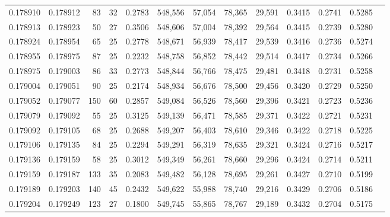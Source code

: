 \begin{tabular}{rrrrrrrrrrrrr}
0.178910 & 0.178912 &  83 &  32 &                                     0.2783 & 548,556 &  57,054 &  78,365 &  29,591 & 0.3415 & 0.2741 & 0.5285 \\
0.178913 & 0.178923 &  50 &  27 &                                     0.3506 & 548,606 &  57,004 &  78,392 &  29,564 & 0.3415 & 0.2739 & 0.5280 \\
0.178924 & 0.178954 &  65 &  25 &                                     0.2778 & 548,671 &  56,939 &  78,417 &  29,539 & 0.3416 & 0.2736 & 0.5274 \\
0.178955 & 0.178975 &  87 &  25 &                                     0.2232 & 548,758 &  56,852 &  78,442 &  29,514 & 0.3417 & 0.2734 & 0.5266 \\
0.178975 & 0.179003 &  86 &  33 &                                     0.2773 & 548,844 &  56,766 &  78,475 &  29,481 & 0.3418 & 0.2731 & 0.5258 \\
0.179004 & 0.179051 &  90 &  25 &                                     0.2174 & 548,934 &  56,676 &  78,500 &  29,456 & 0.3420 & 0.2729 & 0.5250 \\
0.179052 & 0.179077 & 150 &  60 &                                     0.2857 & 549,084 &  56,526 &  78,560 &  29,396 & 0.3421 & 0.2723 & 0.5236 \\
0.179079 & 0.179092 &  55 &  25 &                                     0.3125 & 549,139 &  56,471 &  78,585 &  29,371 & 0.3422 & 0.2721 & 0.5231 \\
0.179092 & 0.179105 &  68 &  25 &                                     0.2688 & 549,207 &  56,403 &  78,610 &  29,346 & 0.3422 & 0.2718 & 0.5225 \\
0.179106 & 0.179135 &  84 &  25 &                                     0.2294 & 549,291 &  56,319 &  78,635 &  29,321 & 0.3424 & 0.2716 & 0.5217 \\
0.179136 & 0.179159 &  58 &  25 &                                     0.3012 & 549,349 &  56,261 &  78,660 &  29,296 & 0.3424 & 0.2714 & 0.5211 \\
0.179159 & 0.179187 & 133 &  35 &                                     0.2083 & 549,482 &  56,128 &  78,695 &  29,261 & 0.3427 & 0.2710 & 0.5199 \\
0.179189 & 0.179203 & 140 &  45 &                                     0.2432 & 549,622 &  55,988 &  78,740 &  29,216 & 0.3429 & 0.2706 & 0.5186 \\
0.179204 & 0.179249 & 123 &  27 &                                     0.1800 & 549,745 &  55,865 &  78,767 &  29,189 & 0.3432 & 0.2704 & 0.5175 \\

\end{tabular}
